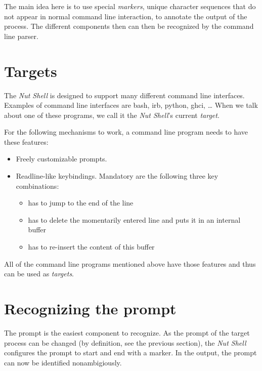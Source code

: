 \documentclass[paper=a4,twoside,abstract=on,cleardoublepage=empty,numbers=noenddot,toc=bib,12pt,appendixprefix=true]{scrreprt}
\begin{document}
The main idea here is to use special \emph{markers}, unique character sequences that do not appear in normal command line interaction, to annotate the output of the process. The different components then can then be recognized by the command line parser.

\section{Targets}
\label{sec:targets}

The \emph{Nut Shell} is designed to support many different command line interfaces. Examples of command line interfaces are bash, irb, python, ghci, … When we talk about one of these programs, we call it the \emph{Nut Shell}'s current \emph{target}.

For the following mechanisms to work, a command line program needs to have these features:

\begin{itemize}
    \item Freely customizable prompts.
    \item Readline-like keybindings. Mandatory are the following three key combinations:
        \begin{itemize}
            \item {} has to jump to the end of the line

            \item {} has to delete the momentarily entered line and puts it in an internal buffer
            
            \item {} has to re-insert the content of this buffer
        \end{itemize}
\end{itemize}

All of the command line programs mentioned above have those features and thus can be used as \emph{targets}.

\section{Recognizing the prompt}

The prompt is the easiest component to recognize. As the prompt of the target process can be changed (by definition, see the previous section), the \emph{Nut Shell} configures the prompt to start and end with a marker. In the output, the prompt can now be identified nonambigiously.
\end{document}
